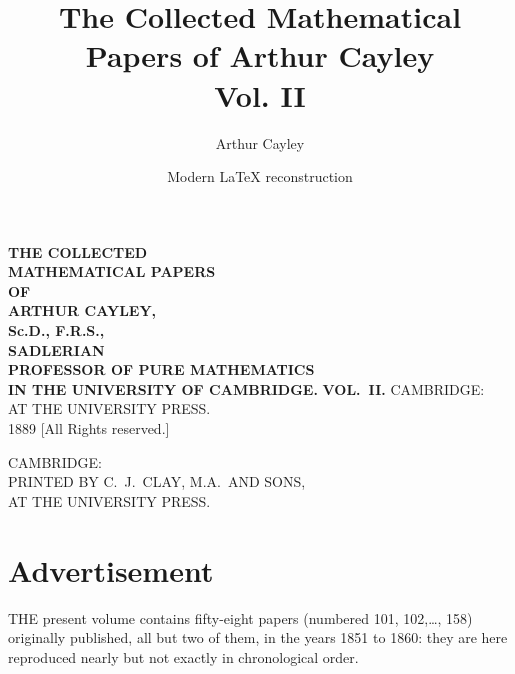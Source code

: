 \documentclass[11pt,a4paper]{book}
\title{The Collected Mathematical Papers of Arthur Cayley\\Vol. II}
\author{Arthur Cayley}
\date{Modern \LaTeX{} reconstruction}
\begin{document}
\maketitle


\thispagestyle{empty}
\begin{center}
\vspace*{2cm}
{\LARGE\bfseries THE COLLECTED\\[0.3em] MATHEMATICAL PAPERS\\[1.5em] OF\\[1.5em] ARTHUR CAYLEY,\\[0.8em] Sc.D., F.R.S.,\\[0.5em] SADLERIAN\\ PROFESSOR OF PURE MATHEMATICS\\ IN THE UNIVERSITY OF CAMBRIDGE.}
\vspace{2cm}
{\LARGE\bfseries VOL.\ II.}
\vfill
{\large CAMBRIDGE:\\ AT THE UNIVERSITY PRESS.\\ 1889}
\vspace{1cm}
{\small [All Rights reserved.]}
\end{center}
\clearpage

\thispagestyle{empty}
\begin{center}
\vfill
CAMBRIDGE:\\ PRINTED BY C.\ J.\ CLAY, M.A.\ AND SONS,\\ AT THE UNIVERSITY PRESS.
\vfill
\end{center}
\clearpage

\section*{Advertisement}

THE present volume contains fifty-eight papers (numbered 101, 102,\ldots, 158) originally published, all but two of them, in the years 1851 to 1860: they are here reproduced nearly but not exactly in chronological order.
\end{document}
